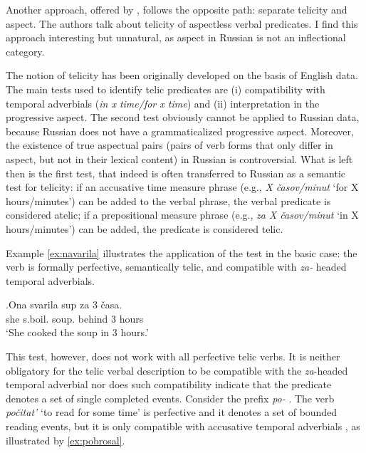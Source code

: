 Another approach, offered by \citet{PaduchevaPentus:08}, follows the opposite path: separate telicity and aspect. The authors talk about telicity of aspectless verbal predicates. I find this approach interesting but unnatural, as aspect in Russian is not an inflectional category. 

The notion of telicity has been originally developed on the basis of English data. The main tests used to identify telic  predicates are (i) compatibility with temporal adverbials (\textit{in x time/for x time}) and (ii) interpretation in the progressive aspect. The second test obviously cannot be applied to Russian data, because Russian does not have a grammaticalized progressive aspect. Moreover, the existence of true aspectual pairs  (pairs of verb forms that only differ in aspect, but not in their lexical content) in Russian is controversial.
What is left then is the first test, that indeed is often transferred to Russian as a semantic test for telicity: if an accusative time measure phrase   (e.g., \textit{X \v{c}asov/minut} `for X hours/minutes') can be added to the verbal phrase, the verbal predicate is considered atelic; if a prepositional measure phrase (e.g., \textit{za X \v{c}asov/minut} `in X hours/minutes') can be added, the predicate is considered telic.

Example \ref{ex:navarila} illustrates the application of the test in the basic case: the verb is formally perfective, semantically telic, and compatible with \textit{za-}  headed temporal adverbials. 

\exg.\label{ex:navarila}Ona svarila\textsuperscript{\PF} sup za 3 \v{c}asa.\\
she s.boil. soup. behind 3 hours\\
\trans `She cooked the soup in 3 hours.'

This test, however, does not work with all perfective telic verbs. It is neither obligatory for the telic verbal description to be compatible with the \textit{za}-headed temporal adverbial nor does such compatibility indicate that the predicate denotes a set of single completed events. Consider the prefix \textit{po-}  . The verb \textit{po\v{c}itat'}\textsuperscript{\PF} `to read for some time' is perfective and it denotes a set of bounded reading events, but it is only compatible with accusative temporal adverbials , as illustrated by \ref{ex:pobrosal}.

